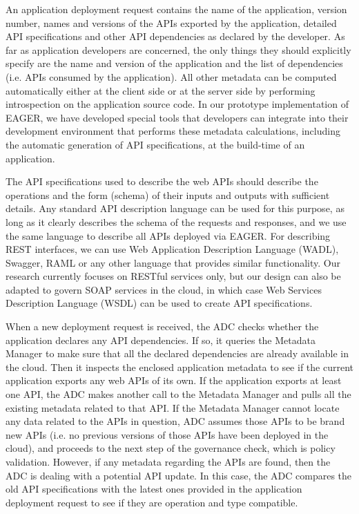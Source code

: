 An application deployment request contains the name of the application, version number, names and versions of the APIs
exported by the application, detailed API specifications and other API dependencies as declared by the developer. As far as application developers are
concerned, the only things they should explicitly specify are the name and version of the application and the list of dependencies (i.e. APIs consumed
by the application). All other metadata can be computed automatically either at the client side or at the server side by performing introspection on the
application source code. In our prototype implementation of EAGER, we have developed special tools that developers can integrate into their
development environment that performs these metadata calculations, including the automatic generation of API specifications, at the build-time
of an application.

The API specifications used to describe the web APIs should describe the operations and the form (schema) of their inputs and outputs with sufficient 
details. Any standard API description language can be used for this purpose, as long as it clearly describes the schema of the requests and
responses, and we use the same language to describe all APIs deployed via EAGER. For describing REST interfaces, we can use Web Application
Description Language (WADL), Swagger, RAML or any other language that provides similar functionality. Our research currently focuses on RESTful 
services only, but our design can also be adapted to govern SOAP services in the cloud, in which case Web Services Description Language 
(WSDL) can be used to create API specifications.

When a new deployment request is received, the ADC checks whether the application declares any API dependencies. If so, it
queries the Metadata Manager to make sure that all the declared dependencies are already available in the cloud. 
Then it inspects the enclosed application metadata to see if the current application exports any web
APIs of its own. If the application exports at least one API, the ADC makes another call to the Metadata Manager and pulls all the existing 
metadata related to that API. If
the Metadata Manager cannot locate any data related to the APIs in question, ADC assumes those APIs to be brand new
APIs (i.e. no previous versions of those APIs have been deployed in the cloud), and proceeds to the next step of the governance check, which is policy
validation. However, if any metadata regarding the APIs are found, then the ADC is dealing with a potential API update. In this
case, the ADC compares the old API specifications with the latest ones provided in the application deployment request to see if
they are operation and type compatible.

